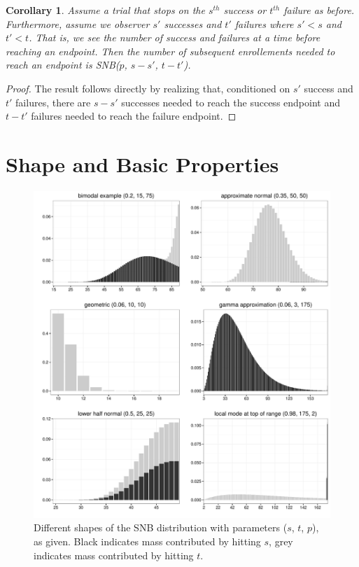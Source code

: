 \documentclass[review]{elsarticle}
\newtheorem{corollary}{Corollary}
\begin{document}
\begin{corollary} \label{conditional_distribution}
Assume a trial that stops on the $s^{th}$ success or $t^{th}$ failure as 
before. 
Furthermore, assume we observer $s'$ successes and $t'$ failures
where $s' < s$ and $t' < t$.
That is, we see the number of success and failures at a time before
reaching an endpoint. Then the number of subsequent enrollements needed 
to reach an endpoint is SNB($p$, $s-s'$, $t-t'$).
\end{corollary}
\begin{proof}
The result follows directly by realizing that, conditioned on $s'$
success and $t'$ failures, there are $s-s'$ successes needed to reach the
success endpoint and $t-t'$ failures needed to reach the failure endpoint.
\end{proof}

\section{Shape and Basic Properties}

\begin{figure}[p!]
\begin{center}
\includegraphics[width=\textwidth]{shapes.pdf}
\end{center}
\caption{Different shapes of the SNB distribution with parameters ($s$, $t$, $p$), as given. Black indicates mass contributed by hitting $s$, grey indicates
mass contributed by hitting $t$. \label{shapes.fig}}
\end{figure}
\end{document}
